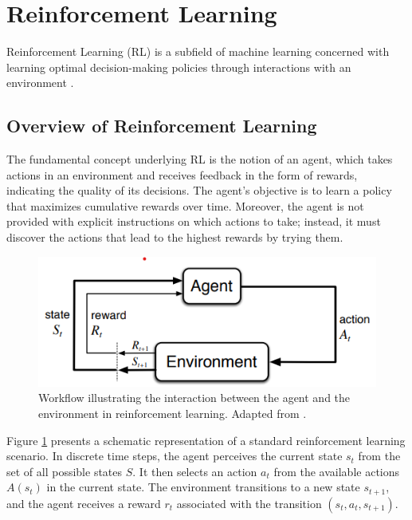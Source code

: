 \section{Reinforcement Learning}

Reinforcement Learning (RL) is a subfield of machine learning concerned with learning optimal decision-making policies through interactions with an environment \cite{sutton2018reinforcement}. 

\subsection{Overview of Reinforcement Learning}
The fundamental concept underlying RL is the notion of an agent, which takes actions in an environment and receives feedback in the form of rewards, indicating the quality of its decisions. The agent's objective is to learn a policy that maximizes cumulative rewards over time. Moreover, the agent is not provided with explicit instructions on which actions to take; instead, it must discover the actions that lead to the highest rewards by trying them.

\begin{figure}[ht]
    \centering
    \includegraphics[scale=1]{images/rl-workflow.png}
    \caption[Agent-Environment Interaction in Reinforcement Learning]{Workflow illustrating the interaction between the agent and the environment in reinforcement learning. Adapted from \cite{sutton2018reinforcement}.}
    \label{fig:sutton_rl_workflow}
\end{figure}

Figure \ref{fig:sutton_rl_workflow} presents a schematic representation of a standard reinforcement learning scenario. In discrete time steps, the agent perceives the current state $s_t$ from the set of all possible states $S$. It then selects an action $a_t$ from the available actions $A(s_t)$ in the current state. The environment transitions to a new state $s_{t+1}$, and the agent receives a reward $r_t$ associated with the transition $(s_t, a_t, s_{t+1})$.

